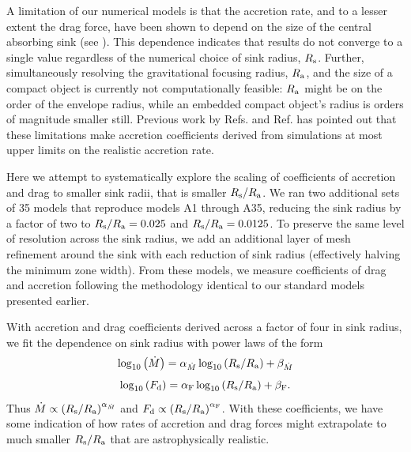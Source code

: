 A limitation of our numerical models is that the accretion rate, and to a lesser extent the drag force, have been shown to depend on the size of the central absorbing sink (see \cite{1994ApJ...427..351R, 1994A&AS..106..505R,1995A&AS..113..133R, 2012ApJ...752...30B,MacLeod_2015,Antoni:2019pgq}). This dependence indicates that results do not converge to a single value regardless of the numerical choice of sink radius, $R_{\rm s}$. Further, simultaneously resolving the gravitational focusing radius, $R_{\rm a}$, and the size of a compact object is currently not computationally feasible: $R_{\rm a}$ might be on the order of the envelope radius, while an embedded compact object's radius is orders of magnitude smaller still. Previous work by Refs. \cite{MacLeod:2014yda,MacLeod_2015} and Ref. \cite{MacLeod:2017} has pointed out that these limitations make accretion coefficients derived from simulations at most upper limits on the realistic accretion rate. 

Here we attempt to systematically explore the scaling of coefficients of accretion and drag to smaller sink radii, that is smaller $R_{\rm s}/R_{\rm a}$. We ran two additional sets of 35 models that reproduce models A1 through A35, reducing the sink radius by a factor of two to $R_{\rm s}/R_{\rm a}=0.025$ and $R_{\rm s}/R_{\rm a}=0.0125$. To preserve the same level of resolution across the sink radius, we add an additional layer of mesh refinement around the sink with each reduction of sink radius (effectively halving the minimum zone width). From these models, we measure coefficients of drag and accretion following the methodology identical to our standard models presented earlier. 

With accretion and drag coefficients derived across a factor of four in sink radius, we fit the dependence on sink radius with power laws of the form 
\begin{equation}\label{eq:powerlawacc}
    \log_{\rm 10}\left( \dot M \right) = {\alpha_{\dot M}} \log_{\rm 10}\left( R_{\rm s}/R_{\rm a} \right) + {\beta_{\dot M}}
\end{equation}
\begin{equation}\label{eq:powerlawdrag}
    \log_{\rm 10}\left( F_{\rm d} \right) = {\alpha_{\rm F}} \log_{\rm 10}\left( R_{\rm s}/R_{\rm a} \right) + {\beta_{\rm F}}.
\end{equation}
Thus $\dot M \propto \left(R_{\rm s}/R_{\rm a}\right)^{\alpha_{\dot M}}$ and $F_{\rm d} \propto \left(R_{\rm s}/R_{\rm a}\right)^{\alpha_{\rm F}}$. With these coefficients, we have some indication of how rates of accretion and drag forces might extrapolate to much smaller $R_{\rm s}/R_{\rm a}$ that are astrophysically realistic. 

